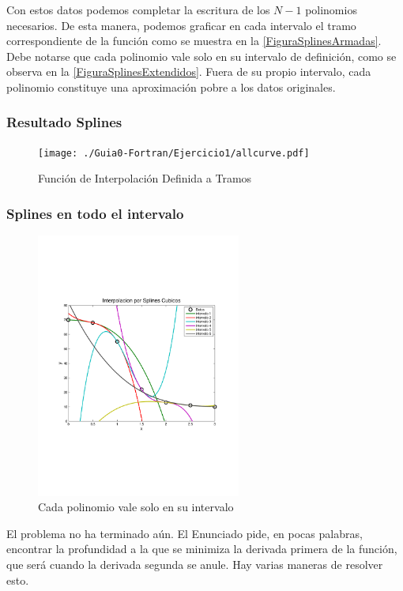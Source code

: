 Con estos datos podemos completar la escritura de los $N-1$ polinomios
necesarios. De esta manera, podemos graficar en cada intervalo 
el tramo correspondiente de la función como se muestra en la
\autoref{FiguraSplinesArmadas}. Debe notarse que cada polinomio vale solo
en su intervalo de definición, como se observa en la \autoref{FiguraSplinesExtendidos}.
Fuera de su propio intervalo, cada polinomio constituye una aproximación pobre
a los datos originales. 

\mode*
\begin{frame}[label=FrameFiguraSplinesArmadas]
  \frametitle<presentation>{Resultado Splines}
  \begin{figure}
    \center
    \texttt{[image: ./Guia0-Fortran/Ejercicio1/allcurve.pdf]}
    \caption{\label{FiguraSplinesArmadas}Función de Interpolación Definida a Tramos}
  \end{figure}
\end{frame}

\begin{frame}[label=FrameFiguraSplinesExtendidos]
  \frametitle<presentation>{Splines en todo el intervalo}
  \begin{figure}
    \center
    \includegraphics[width=0.6\textwidth,trim=1cm 7cm 1cm 6cm]{./scplines.pdf}
    \caption{\label{FiguraSplinesExtendidos} Cada polinomio vale solo en su intervalo}
  \end{figure}
\end{frame}

El problema no ha terminado aún. El Enunciado pide, en pocas palabras,
encontrar la profundidad a la que se minimiza la derivada primera
de la función, que será cuando la derivada segunda se anule.
Hay varias maneras de resolver esto. 


